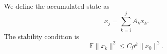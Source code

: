 \documentclass{article}
\begin{document}
We define the accumulated state as
\begin{equation}
  \label{eq:accumulation}
  x_j = \sum_{k=i}^{j} A_k x_k.
\end{equation}
The stability condition is
\begin{equation}
  \label{eq:stability}
  \mathbb{E}\|x_k\|^2 \leq C\rho^k\|x_0\|^2.
\end{equation}
\end{document}
